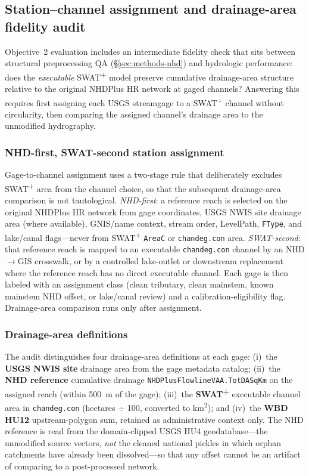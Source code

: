 \subsection{Station--channel assignment and drainage-area fidelity audit}
\label{sec:methods-drainage-audit}

Objective~2 evaluation includes an intermediate fidelity check that sits between structural preprocessing QA (\S\ref{sec:methods-nhd}) and hydrologic performance: does the \emph{executable} SWAT\textsuperscript{+} model preserve cumulative drainage-area structure relative to the original NHDPlus HR network at gaged channels?
Answering this requires first assigning each USGS streamgage to a SWAT\textsuperscript{+} channel without circularity, then comparing the assigned channel's drainage area to the unmodified hydrography.

\subsubsection*{NHD-first, SWAT-second station assignment}
Gage-to-channel assignment uses a two-stage rule that deliberately excludes SWAT\textsuperscript{+} area from the channel choice, so that the subsequent drainage-area comparison is not tautological.
\emph{NHD-first}: a reference reach is selected on the original NHDPlus HR network from gage coordinates, USGS NWIS site drainage area (where available), GNIS/name context, stream order, LevelPath, \texttt{FType}, and lake/canal flags---never from SWAT\textsuperscript{+} \texttt{AreaC} or \texttt{chandeg.con} area.
\emph{SWAT-second}: that reference reach is mapped to an executable \texttt{chandeg.con} channel by an NHD$\rightarrow$GIS crosswalk, or by a controlled lake-outlet or downstream replacement where the reference reach has no direct executable channel.
Each gage is then labeled with an assignment class (clean tributary, clean mainstem, known mainstem NHD offset, or lake/canal review) and a calibration-eligibility flag.
Drainage-area comparison runs only after assignment.

\subsubsection*{Drainage-area definitions}
The audit distinguishes four drainage-area definitions at each gage: (i)~the \textbf{USGS NWIS site} drainage area from the gage metadata catalog; (ii)~the \textbf{NHD reference} cumulative drainage \texttt{NHDPlusFlowlineVAA.TotDASqKm} on the assigned reach (within 500~m of the gage); (iii)~the \textbf{SWAT\textsuperscript{+}} executable channel area in \texttt{chandeg.con} (hectares $\div$ 100, converted to km\textsuperscript{2}); and (iv)~the \textbf{WBD HU12} upstream-polygon sum, retained as administrative context only.
The NHD reference is read from the domain-clipped USGS HU4 geodatabase---the unmodified source vectors, \emph{not} the cleaned national pickles in which orphan catchments have already been dissolved---so that any offset cannot be an artifact of comparing to a post-processed network.

